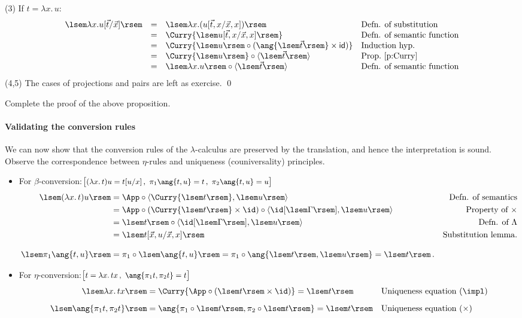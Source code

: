 \documentclass{svmult}
\begin{document}
%
(3) If $t = \lambda x.\,u$:
\[ \begin{array}{rcl@{\quad}l}
\lsem \lambda x.u [\vec{t}/\vec{x}] \rsem & = & \lsem \lambda x. (u[\vec{t},x/\vec{x},x]) \rsem &  \text{Defn. of substitution} \\
& = & \Curry{\lsem u[\vec{t},x/\vec{x},x]  \rsem} & \text{Defn. of semantic function} \\
& = &  \Curry{\lsem u \rsem \circ (\ang{\lsem\vec{t}\rsem}\times \mathsf{id})} &  \text{Induction hyp.} \\
& = & \Curry{\lsem u \rsem} \circ  \langle \lsem \vec{t} \rsem \rangle & \text{Prop.~\ref{p:Curry}} \\
& = & \lsem \lambda x.u \rsem \circ  \langle \lsem \vec{t} \rsem \rangle & \text{Defn. of semantic function}
\end{array}
\]
(4,5) The cases of projections and pairs are left as exercise. \qed

\begin{myexercise}
Complete the proof of the above proposition.
\end{myexercise}


\paragraph{Validating the conversion rules}
We can now show that the conversion rules of the $\lambda$-calculus are {preserved} by the translation, and hence the interpretation is
{sound}. Observe the correspondence between $\eta$-rules and uniqueness (couniversality) principles.
\begin{itemize}
    \item For $\beta$-conversion:\qd $\big[\text{\small$(\lambda x. \, t)u = t[u/x]\,,\ \pi_1\ang{t,u}=t\,,\ \pi_2\ang{t,u}=u$}\big]$
\begin{align*}
\lsem (\lambda x.\,t)u \rsem &=  \App \circ \langle \Curry{\lsem t \rsem}, \lsem u \rsem \rangle & \text{Defn. of semantics}& \\
& =  \App \circ (\Curry{\lsem t \rsem} \times \id) \circ \langle \id[\lsem \Gamma \rsem], \lsem u \rsem \rangle & \text{Property of $\times$}& \\
& = \lsem t \rsem \circ \langle \id[\lsem \Gamma \rsem], \lsem u \rsem \rangle & \text{Defn. of }\Lambda& \\
& = \lsem t[\vec{x},u/\vec{x},x] \rsem & \text{Substitution lemma}.&
\\[3mm]
\lsem \pi_1\ang{t,u} \rsem &= \pi_1\circ \lsem\ang{t,u}\rsem = \pi_1\circ \ang{\lsem t\rsem,\lsem u\rsem} = \lsem t \rsem\,.
\end{align*}
\item For
$\eta$-conversion:\qd $\big[\text{\small$t = \lambda x.\,tx \,,\ \ang{\pi_1t,\pi_2t}=t$}\big]$
\begin{align*}
    \lsem  \lambda x.\,tx \rsem &= \Curry{\App \circ (\lsem t \rsem \times \id)} = \lsem t \rsem & \text{Uniqueness equation }&(\impl)\\[2mm]
    \lsem \ang{\pi_1t,\pi_2t} \rsem &= \ang{\pi_1\circ\lsem t\rsem, \pi_2\circ\lsem t\rsem} = \lsem t \rsem & \text{Uniqueness equation }&(\times)
\end{align*}
\end{itemize}
\end{document}
